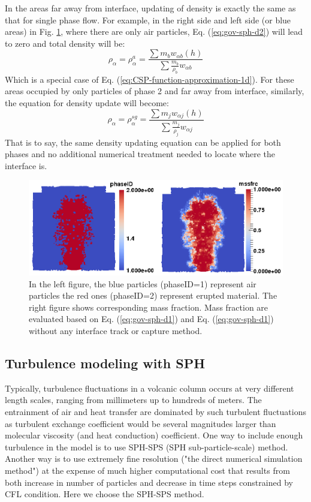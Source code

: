 \documentclass[journal abbreviation, manuscript]{copernicus}
\begin{document}
In the areas far away from interface, updating of density is exactly the same as that for single phase flow. For example, in the right side and left side (or blue areas) in Fig. \ref{fig:SPH-multiple-density}, where there are only air particles, Eq.  (\ref{eq:gov-sph-d2}) will lead to zero and total density will be:
\begin{equation}
\rho_{\alpha}=\rho_{\alpha}^a=\frac{\sum m_b w_{\alpha b} (h)}{\sum \frac{m_b}{\rho_b} w_{\alpha b}}
\end{equation}
Which is a special case of Eq. (\ref{eq:CSP-function-approximation-1d}). For these areas occupied by only particles of phase 2 and far away from interface, similarly, the equation for density update will become: 
\begin{equation}
\rho_{\alpha}=\rho_{\alpha}^{sg}=\frac{\sum m_j w_{\alpha j} (h)}{\sum \frac{m_j}{\rho_j} w_{\alpha j}}
\end{equation}
That is to say, the same density updating equation can be applied for both phases and no additional numerical treatment needed to locate where the interface is.

\begin{figure}
\includegraphics[width=12cm]{Interface.png}
\caption{In the left figure, the blue particles (phaseID=1) represent air particles the red ones (phaseID=2) represent erupted material. The right figure shows corresponding mass fraction. Mass fraction are evaluated based on Eq. (\ref{eq:gov-sph-d1}) and Eq. (\ref{eq:gov-sph-d1}) without any interface track or capture method.}
\label{fig:SPH-multiple-density}
\end{figure}

\subsection{Turbulence modeling with SPH}
Typically, turbulence fluctuations in a volcanic column occurs at very different length scales, ranging from millimeters up to hundreds of meters. The entrainment of air and heat transfer are dominated by such turbulent fluctuations as turbulent exchange coefficient would be several magnitudes larger than molecular viscosity (and heat conduction) coefficient. One way to include enough turbulence in the model is to use SPH-SPS (SPH sub-particle-scale) method.
Another way is to use extremely fine resolution ("the direct numerical simulation method") at the expense of much higher computational cost that results from both increase in number of particles and decrease in time steps constrained by CFL condition. Here we choose the SPH-SPS method.
\end{document}
